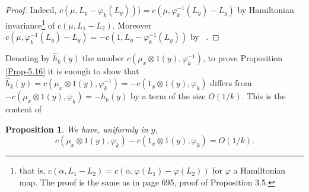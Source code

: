 \documentclass[JEP,XML,SOM,NoFloatCountersInSection,Unicode,published]{cedram}
\numberwithin{equation}{section}
\let \phi \varphi
\theoremstyle{plain}
\newtheorem{proposition}[theorem]{Proposition}
\theoremstyle{definition}
\theoremstyle{remark}
\begin{document}
\begin{proof}
Indeed, $c(\mu,L_y-\varphi_k(L_y)))=c(\mu,\varphi_k^{-1}(L_y)-L_y)$ by Hamiltonian invariance\footnote{that is, $c(\alpha, L_1-L_2)=c(\alpha, \varphi(L_1)-\varphi(L_2))$ for $\varphi$ a Hamiltonian map. The proof is the same as in \cite{Viterbo-STAGGF} page 695, proof of Proposition 3.5.} of $c(\mu,L_1-L_2)$. Moreover $c(\mu,\varphi_k^{-1}(L_y)-L_y)= -c(1,L_y -\varphi_k^{-1}(L_y))$ by ~\cite[Cor.\,2.8, p.\,693]{Viterbo-STAGGF}.
\end{proof}

Denoting by $\widehat h_{k}(y)$ the number $c(\mu_{x}\otimes 1(y), \phi_{k}^{-1})$, to prove Proposition \ref{Prop-5.16} it is enough to show that $\widehat h_k(y)=c(\mu_x\otimes1(y),\varphi_k^{-1})=-c(1_x\otimes1(y),\varphi_k)$ differs from $-c(\mu_x\otimes1(y),\varphi_k)=-h_k(y)$ by a term of the size $O(1/k)$. This is the content of
\begin{proposition}\label{Prop-7.2}
We have, uniformly in $y$,
\[
c(\mu_x\otimes 1(y),\varphi_k)-c(1_x\otimes 1(y),\varphi_k)=O(1/k).
\]
\end{proposition}
\end{document}
